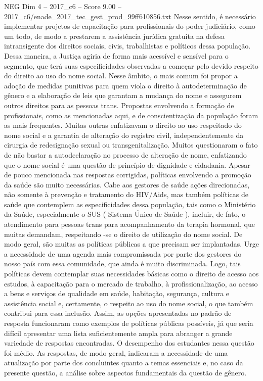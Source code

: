 \begin{textsample}{NEG Dim 4 – 2017\_c6 – Score 9.00 – 2017\_c6/enade\_2017\_tec\_gest\_prod\_99ff610856.txt}
Nesse sentido, é necessário implementar projetos de capacitação para profissionais do poder judiciário, como um todo, de modo a prestarem a assistência jurídica gratuita na defesa intransigente dos direitos sociais, civis, trabalhistas e políticos dessa população.
Dessa maneira, a Justiça agiria de forma mais acessível e sensível para o segmento, que terá suas especificidades observadas a começar pelo devido respeito do direito ao uso do nome social.
Nesse âmbito, o mais comum foi propor a adoção de medidas punitivas para quem viola o direito à autodeterminação de gênero e a elaboração de leis que garantam a mudança do nome e assegurem outros direitos para as pessoas trans.
Propostas envolvendo a formação de profissionais, como as mencionadas aqui, e de conscientização da população foram as mais frequentes.
Muitas outras enfatizavam o direito ao uso respeitado do nome social e a garantia de alteração do registro civil, independentemente da cirurgia de redesignação sexual ou transgenitalização.
Muitos questionaram o fato de não bastar a autodeclaração no processo de alteração de nome, enfatizando que o nome social é uma questão de princípio de dignidade e cidadania.
Apesar de pouco mencionada nas respostas corrigidas, políticas envolvendo a promoção da saúde são muito necessárias.
Cabe aos gestores de saúde ações direcionadas, não somente à prevenção e tratamento do HIV/Aids, mas também políticas de saúde que contemplem as especificidades dessa população, tais como o Ministério da Saúde, especialmente o SUS ( Sistema Único de Saúde ), incluir, de fato, o atendimento para pessoas trans para acompanhamento da terapia hormonal, que muitas demandam, respeitando -se o direito de utilização do nome social.
De modo geral, são muitas as políticas públicas a que precisam ser implantadas.
Urge a necessidade de uma agenda mais compromissada por parte dos gestores do nosso país com essa comunidade, que ainda é muito discriminada.
Logo, tais políticas devem contemplar suas necessidades básicas como o direito de acesso aos estudos, à capacitação para o mercado de trabalho, à profissionalização, ao acesso a bens e serviços de qualidade em saúde, habitação, segurança, cultura e assistência social e, certamente, o respeito ao uso do nome social, o que também contribui para essa inclusão.
Assim, as opções apresentadas no padrão de resposta funcionaram como exemplos de políticas públicas possíveis, já que seria difícil apresentar uma lista suficientemente ampla para abranger a grande variedade de respostas encontradas.
O desempenho dos estudantes nessa questão foi médio.
As respostas, de modo geral, indicaram a necessidade de uma atualização por parte dos concluintes quanto a temas essenciais e, no caso da presente questão, a análise sobre aspectos fundamentais da questão de gênero.

\end{textsample}
